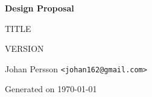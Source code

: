 \documentclass[11pt,a4paper,twoside,openright]{report}
\makeatletter
\newcommand{\reportauthor}{Johan Persson  \texttt{<johan162@gmail.com>}}
\makeatother
\begin{document}
\begin{titlepage}
  \centering
  \vspace*{2.0cm}
  {\Huge\bfseries\color{brandblue}Design Proposal\par}
  \vspace{1.2cm}
  {\Large {{TITLE}}\par}
  \vspace{0.1cm}
  {\Large {{VERSION}}\par}
  \vspace{0.8cm}
  
  \vfill
  {\large \reportauthor\par}
  {\large Generated on \today\par}
\end{titlepage}

\tableofcontents
\clearpage

\end{document}
